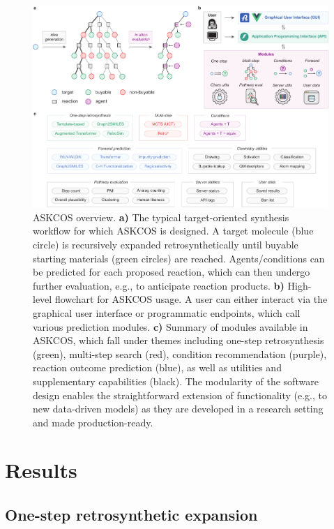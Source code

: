\documentclass[pdflatex,sn-mathphys-num]{sn-jnl}%
\theoremstyle{thmstyleone}%
\theoremstyle{thmstyletwo}%
\theoremstyle{thmstylethree}%
\begin{document}
\begin{figure}[h!]
\centering
\includegraphics[width=1.0\textwidth]{media/0.Overviewfix.pdf}
\caption{ASKCOS overview. \textbf{a)} The typical target-oriented synthesis workflow for which ASKCOS is designed. A target molecule (blue circle) is recursively expanded retrosynthetically until buyable starting materials (green circles) are reached. Agents/conditions can be predicted for each proposed reaction, which can then undergo further evaluation, e.g., to anticipate reaction products. \textbf{b)} High-level flowchart for ASKCOS usage. A user can either interact via the graphical user interface or programmatic endpoints, which call various prediction modules. \textbf{c)} Summary of modules available in ASKCOS, which fall under themes including one-step retrosynthesis (green), multi-step search (red), condition recommendation (purple), reaction outcome prediction (blue), as well as utilities and supplementary capabilities (black). The modularity of the software design enables the straightforward extension of functionality (e.g., to new data-driven models) as they are developed in a research setting and made production-ready.}\label{fig_overview}
\end{figure}

\section{Results}\label{results}

\subsection{One-step retrosynthetic expansion}\label{results_one_step}
\end{document}

